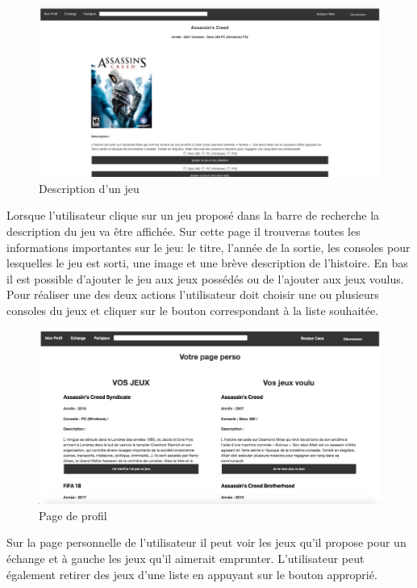 \documentclass[a4paper,12pt,abstracton,titlepage]{scrartcl}
\begin{document}
\begin{figure}[h]
  \centering
    \includegraphics[width=\textwidth]{./doc/05_description_jeu.png}
	\caption{Description d'un jeu}
	\label{jeu}
\end{figure}

\newpage
Lorsque l'utilisateur clique sur un jeu proposé dans la barre de recherche la description du jeu va être affichée. Sur cette page il trouveras toutes les informations importantes sur le jeu: le titre, l'année de la sortie, les consoles pour lesquelles le jeu est sorti, une image et une brève description de l'histoire. En bas il est possible d'ajouter le jeu aux jeux possédés ou de l'ajouter aux jeux voulus. Pour réaliser une des deux actions l'utilisateur doit choisir une ou plusieurs consoles du jeux et cliquer sur le bouton correspondant à la liste souhaitée.
\vspace{1cm}
\begin{figure}[!h]
  \centering
    \includegraphics[width=\textwidth]{./doc/03_profile.png}
	\caption{Page de profil}
	\label{profile}
\end{figure}

\newpage
Sur la page personnelle de l'utilisateur il peut voir les jeux qu'il propose pour un échange et à gauche les jeux qu'il aimerait emprunter. L'utilisateur peut également retirer des jeux d'une liste en appuyant sur le bouton approprié.\\
\end{document}
